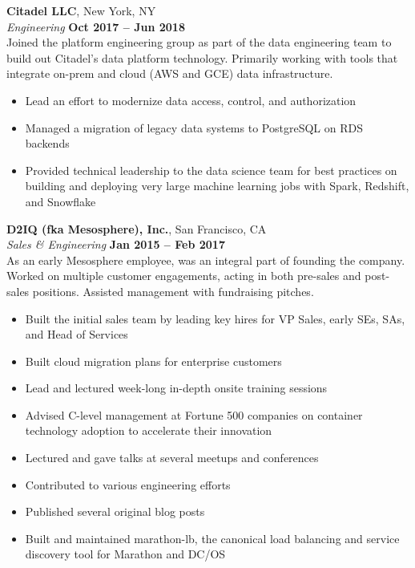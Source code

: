 \documentclass[margin,line]{resume}
\begin{document}
\begin{resume}
    \textbf{Citadel LLC}, New York, NY \vspace{2mm}\\\vspace{1mm}%
    \textsl{Engineering} \hfill \textbf{Oct 2017 -- Jun 2018}\\
    Joined the platform engineering group as part of the data engineering
    team to build out Citadel's data platform technology. Primarily working
    with tools that integrate on-prem and cloud (AWS and GCE) data
    infrastructure.

    \begin{itemize}
        \item Lead an effort to modernize data access, control, and
        authorization
        \item Managed a migration of legacy data systems to PostgreSQL on RDS
        backends
        \item Provided technical leadership to the data science team for best
        practices on building and deploying very large machine learning jobs
        with Spark, Redshift, and Snowflake
    \end{itemize}

    \pagebreak[4]

    \textbf{D2IQ (fka Mesosphere), Inc.}, San Francisco, CA \vspace{2mm}\\\vspace{1mm}%
    \textsl{Sales \& Engineering} \hfill \textbf{Jan 2015 -- Feb 2017}\\
    As an early Mesosphere employee, was an integral part of founding the
    company.  Worked on multiple customer engagements, acting in both pre-sales
    and post-sales positions. Assisted management with fundraising pitches.

    \begin{itemize}
        \item Built the initial sales team by leading key hires for VP Sales,
        early SEs, SAs, and Head of Services
        \item Built cloud migration plans for enterprise customers
        \item Lead and lectured week-long in-depth onsite training sessions
        \item Advised C-level management at Fortune 500 companies on container
        technology adoption to accelerate their innovation
        \item Lectured and gave talks at several meetups and conferences
        \item Contributed to various engineering efforts
        \item Published several original blog posts
        \item Built and maintained marathon-lb, the canonical load balancing and
        service discovery tool for Marathon and DC/OS
    \end{itemize}


\end{resume}
\end{document}
